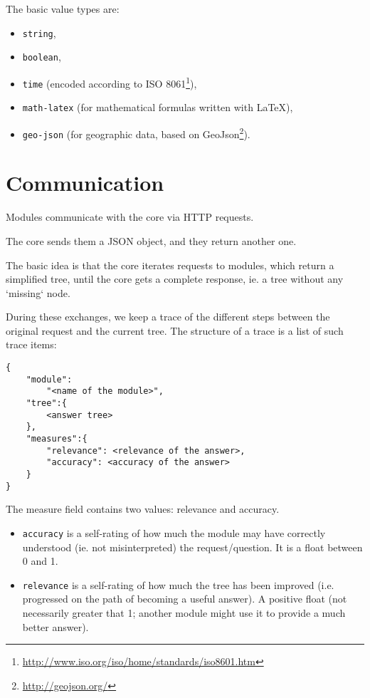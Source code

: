 The basic value types are:
\begin{itemize}
    \item \texttt{string},
    \item \texttt{boolean},
    \item \texttt{time} (encoded according to ISO 8061\footnote{\url{http://www.iso.org/iso/home/standards/iso8601.htm}}),
    \item \texttt{math-latex} (for mathematical formulas written with \LaTeX),
    \item \texttt{geo-json} (for geographic data, based on GeoJson\footnote{\url{http://geojson.org/}}).
\end{itemize}

\section{Communication}

Modules communicate with the core via HTTP requests.

The core sends them a JSON object, and they return another one.

The basic idea is that the core iterates requests to modules, which return a simplified tree, until the core gets a complete response, ie. a tree without any `missing` node.

During these exchanges, we keep a trace of the different steps between the original request and the current tree. The structure of a trace is a list of such trace items:
\begin{verbatim}
{
    "module":
        "<name of the module>", 
    "tree":{
        <answer tree>
    },
    "measures":{
        "relevance": <relevance of the answer>,
        "accuracy": <accuracy of the answer>
    }
}
\end{verbatim}

The measure field contains two values: relevance and accuracy.

\begin{itemize}
    \item \texttt{accuracy} is a self-rating of how much the module may have correctly understood (ie. not misinterpreted) the request/question. It is a float between 0 and 1.
    \item \texttt{relevance} is a self-rating of how much the tree has been improved (i.e. progressed on the path of becoming a useful answer). A positive float (not necessarily greater that 1; another module might use it to provide a much better answer).
\end{itemize}

